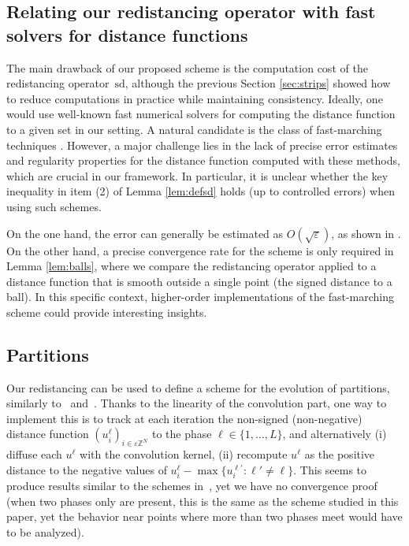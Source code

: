 \documentclass[10pt]{amsart}
\theoremstyle{plain}
\theoremstyle{definition}
\newcommand{\Z}{\mathbb{Z}}
\newcommand{\e}{\varepsilon}
\newcommand{\sd}{\,\mathrm{sd}}
\newcommand{\ez}{\e\Z^N}
\numberwithin{equation}{section}
\begin{document}
\subsection{Relating our redistancing operator  with fast solvers for distance functions}
The main drawback of our proposed scheme is the computation cost of the redistancing operator $\sd$, although the previous Section \ref{sec:strips} showed how to reduce computations in practice while maintaining consistency.
Ideally, one would use well-known fast numerical solvers for computing the distance function to a given set in our setting. A natural candidate is the class of fast-marching techniques \cite{RouyTourin,Set,OshSet,ElseyEsedoglu14,Saye14}.  
However, a major challenge lies in the lack of precise error estimates and regularity properties for the distance function computed with these methods, which are crucial in our framework. In particular, it is unclear whether the key inequality in item (2) of Lemma \ref{lem:defsd} holds (up to controlled errors) when using such schemes.  


On the one hand, the error can generally be estimated as $O(\sqrt{\e})$, as shown in \cite[Sec.~9]{Mon-notes}. On the other hand, a precise convergence rate for the scheme is only required in Lemma \ref{lem:balls}, where we compare the redistancing operator applied to a distance function that is smooth outside a single point (the signed distance to a ball). In this specific context, higher-order implementations of the fast-marching scheme \cite{SetSch,AhmBakMcLRen} could provide interesting insights.


\subsection{Partitions}
Our redistancing can be used to define a scheme for the evolution of partitions, similarly
to~\cite[Sec.~5.3]{EsedogluRuuthTsai10}
and~\cite{ElseyEsedogluSmereka11, EseOtt}. 
Thanks to the linearity of the
convolution part, one way to implement
this is to track at each iteration the
non-signed (non-negative) distance function $(u^\ell_i)_{i\in\ez}$
to the phase $\ell\in\{1,\dots, L\}$, 
and alternatively (i) diffuse
each $u^\ell$ with the convolution kernel, (ii)
recompute $u^\ell$ as the positive distance to
the negative values of $u^\ell_i - \max\{u^{\ell'}_i: \ell'\neq \ell\}$. This seems to produce results
similar to the schemes in~\cite{EsedogluRuuthTsai10,ElseyEsedogluSmereka11}, yet we have
no convergence proof (when two
phases only are present, this is the same as the scheme
studied in this paper, yet the behavior near points where more than two phases meet would have to be analyzed).
\end{document}
